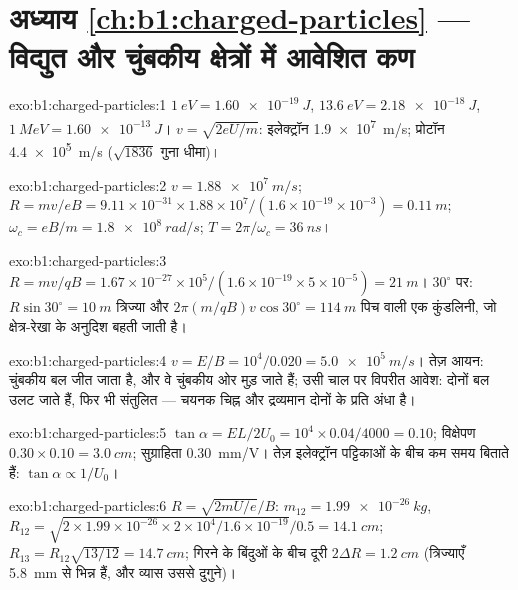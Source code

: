 \section*{अध्याय \ref{ch:b1:charged-particles} --- विद्युत और चुंबकीय क्षेत्रों में आवेशित कण}

\begin{solution}{exo:b1:charged-particles:1}
$\qty{1}{eV} = \qty{1.60e-19}{J}$, $\qty{13.6}{eV} = \qty{2.18e-18}{J}$,
$\qty{1}{MeV} = \qty{1.60e-13}{J}$। $v = \sqrt{2eU/m}$: इलेक्ट्रॉन
\qty{1.9e7}{m/s}; प्रोटॉन \qty{4.4e5}{m/s} ($\sqrt{1836}$ गुना धीमा)।
\end{solution}

\begin{solution}{exo:b1:charged-particles:2}
$v = \qty{1.88e7}{m/s}$; $R = mv/eB = 9.11\times10^{-31} \times 1.88\times10^7/
(1.6\times10^{-19} \times 10^{-3}) = \qty{0.11}{m}$; $\omega_c = eB/m =
\qty{1.8e8}{rad/s}$; $T = 2\pi/\omega_c = \qty{36}{ns}$।
\end{solution}

\begin{solution}{exo:b1:charged-particles:3}
$R = mv/qB = 1.67\times10^{-27} \times 10^5/(1.6\times10^{-19} \times 5\times
10^{-5}) = \qty{21}{m}$। $30^\circ$ पर: $R\sin 30^\circ
= \qty{10}{m}$ त्रिज्या और $2\pi(m/qB)v\cos 30^\circ = \qty{114}{m}$ पिच
वाली एक कुंडलिनी, जो क्षेत्र-रेखा के अनुदिश बहती जाती है।
\end{solution}

\begin{solution}{exo:b1:charged-particles:4}
$v = E/B = 10^4/0.020 = \qty{5.0e5}{m/s}$। तेज़ आयन: चुंबकीय बल जीत जाता है,
और वे चुंबकीय ओर मुड़ जाते हैं; उसी चाल पर विपरीत आवेश: दोनों बल उलट जाते
हैं, फिर भी संतुलित --- चयनक चिह्न और द्रव्यमान दोनों के प्रति अंधा है।
\end{solution}

\begin{solution}{exo:b1:charged-particles:5}
$\tan\alpha = EL/2U_0 = 10^4 \times 0.04/4000 = 0.10$; विक्षेपण
$0.30 \times 0.10 = \qty{3.0}{cm}$; सुग्राहिता \qty{0.30}{mm/V}। तेज़
इलेक्ट्रॉन पट्टिकाओं के बीच कम समय बिताते हैं: $\tan\alpha \propto 1/U_0$।
\end{solution}

\begin{solution}{exo:b1:charged-particles:6}
$R = \sqrt{2mU/e}/B$: $m_{12} = \qty{1.99e-26}{kg}$, $R_{12} = \sqrt{2 \times
1.99\times10^{-26} \times 2\times10^4/1.6\times10^{-19}}/0.5 = \qty{14.1}{cm}$;
$R_{13} = R_{12}\sqrt{13/12} = \qty{14.7}{cm}$; गिरने के बिंदुओं के बीच दूरी $2\Delta R =
\qty{1.2}{cm}$ (त्रिज्याएँ \qty{5.8}{mm} से भिन्न हैं, और व्यास उससे
दुगुने)।
\end{solution}

